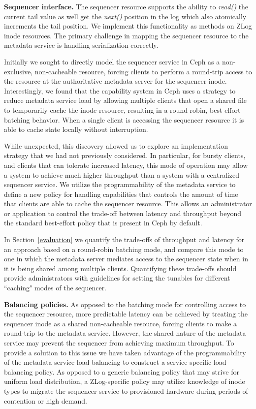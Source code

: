 \documentclass[preprint]{sigplanconf-eurosys}
\begin{document}
{\bf Sequencer interface.} The sequencer resource supports the ability to
\emph{read()} the current tail value as well get the \emph{next()} position in
the log which also atomically increments the tail position. We implement this
functionality as methods on ZLog inode resources. The primary challenge in
mapping the sequencer resource to the metadata service is handling
serialization correctly.

Initially we sought to directly model the sequencer service in Ceph as a
non-exclusive, non-cacheable resource, forcing clients to perform a round-trip
access to the resource at the authoritative metadata server for the sequencer
inode.  Interestingly, we found that the capability system in Ceph uses a
strategy to reduce metadata service load by allowing multiple clients that
open a shared file to temporarily cache the inode resource, resulting in a
round-robin, best-effort batching behavior. When a single client is accessing
the sequencer resource it is able to cache state locally without interruption.

While unexpected, this discovery allowed us to explore an implementation
strategy that we had not previously considered. In particular, for bursty
clients, and clients that can tolerate increased latency, this mode of operation may
allow a system to achieve much higher throughput than a system with a
centralized sequencer service.
We utilize the programmability of the metadata service to define a new policy
for handling capabilities that controls the amount of time that clients are
able to cache the sequencer resource. This allows an administrator or
application to control the trade-off between latency and throughput beyond the
standard best-effort policy that is present in Ceph by default. 

In Section~\ref{evaluation} we quantify the trade-offs of throughput and
latency for an approach based on a round-robin batching mode, and compare this
mode to one in which the metadata server mediates access to the sequencer state
when in it is being shared among multiple clients. Quantifying these trade-offs
should provide administrators with guidelines for setting the tunables for
different ``caching" modes of the sequencer.


{\bf Balancing policies.}
As opposed to the batching mode for controlling access to the sequencer
resource, more predictable latency can be achieved by treating the sequencer
inode as a shared non-cacheable resource, forcing clients to make a round-trip
to the metadata service. However, the shared nature of the metadata service
may prevent the sequencer from achieving maximum throughput. To provide a
solution to this issue we have taken advantage of the programmability of the
metadata service load balancing to construct a service-specific load balancing
policy. As opposed to a generic balancing policy that may strive for uniform
load distribution, a ZLog-specific policy may utilize knowledge of inode types
to migrate the sequencer service to provisioned hardware during periods of
contention or high demand.
\end{document}
